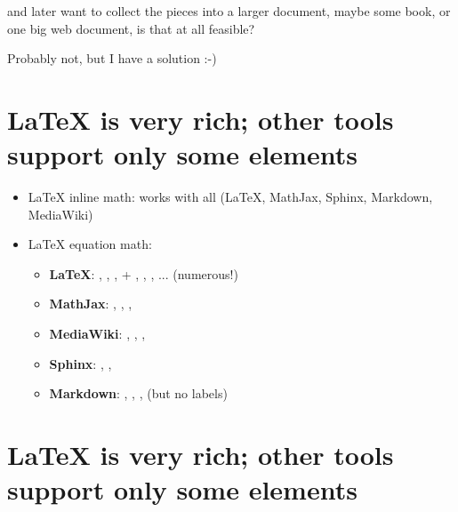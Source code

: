 \documentclass[%
oneside,                 %
final,                   %
chapterprefix=true,      %
open=right               %
10pt]{book}
\begin{document}
\noindent
and later want to collect the pieces into a larger document, maybe
some book, or one big web document, is that at all feasible?

Probably not, but I have a solution :-)


\section{{\LaTeX} is very rich; other tools support only some elements}

\begin{itemize}
 \item {\LaTeX} inline math: works with all ({\LaTeX}, MathJax, Sphinx, Markdown, MediaWiki)

 \item {\LaTeX} equation math:
\begin{itemize}

    \item \textbf{LaTeX}: , , ,  +
      , , , ... (numerous!)

    \item \textbf{MathJax}: , , , 

    \item \textbf{MediaWiki}: , , , 

    \item \textbf{Sphinx}: , , 

    \item \textbf{Markdown}: , , ,  (but no labels)
\end{itemize}

\noindent
\end{itemize}

\noindent
\section{{\LaTeX} is very rich; other tools support only some elements}
\end{document}
